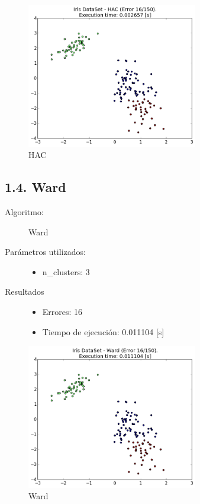 \documentclass{article}
\begin{document}
\begin{figure}[H]
  \centering
  \includegraphics[width=0.666\textwidth]{img/HAC.png}
  \caption{HAC}
\end{figure}

\newpage




\subsection*{1.4. \; Ward}
\begin{description}
  \item[Algoritmo:] Ward
  \item[Parámetros utilizados:] \hfill
    \begin{itemize}
      \item n\_clusters: 3
    \end{itemize}
  \item[Resultados]\hfill
    \begin{itemize}
      \item Errores: 16
      \item Tiempo de ejecución: 0.011104 [s]
    \end{itemize}
\end{description}

\begin{figure}[H]
  \centering
  \includegraphics[width=0.666\textwidth]{img/Ward.png}
  \caption{Ward}
\end{figure}
\end{document}
